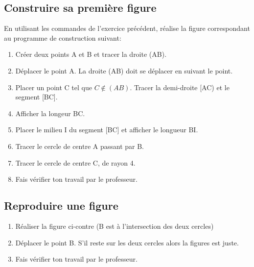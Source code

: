 \begin{activite}
	\subsection{Construire sa première figure}
En utilisant les commandes de l'exercice précédent, réalise la figure correspondant au programme de construction suivant:
\begin{enumerate}
\item Créer deux points A et B et tracer la droite (AB).
\item Déplacer le point A. La droite (AB) doit se déplacer en suivant le point.
\item Placer un point C tel que $C \notin(AB)$. Tracer la demi-droite [AC) et le segment [BC].
\item Afficher la longeur BC.
\item Placer le milieu I du segment [BC] et afficher le longueur BI.
\item Tracer le cercle de centre A passant par B.
\item Tracer le cercle de centre C, de rayon 4.
\item Fais vérifier ton travail par le professeur.
\end{enumerate}

	\subsection{Reproduire une figure}
\begin{enumerate}
\item Réaliser la figure ci-contre (B est à l'intersection des deux cercles)
\item Déplacer le point B. S'il reste sur les deux cercles alors la figures est juste.
\item Fais vérifier ton travail par le professeur.
\end{enumerate}
\begin{center}

\end{center}
\end{activite}


